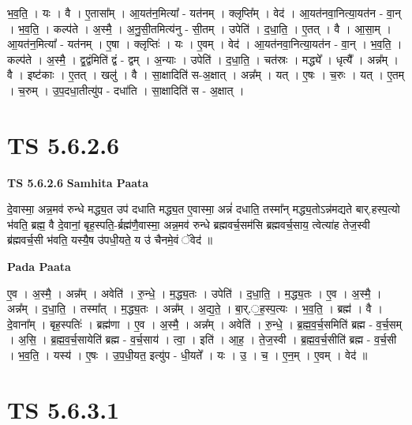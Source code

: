 \documentclass[17pt]{extarticle}
\begin{document}
भ॒व॒ति॒ । यः । वै । ए॒तासा᳚म् । आ॒यत॑न॒मित्या᳚ - यत॑नम् । क्लृप्ति᳚म् । वेद॑ । आ॒यत॑नवा॒नित्या॒यत॑न - वा॒न् । भ॒व॒ति॒ । कल्प॑ते । अ॒स्मै॒ । अ॒नु॒सी॒तमित्य॑नु - सी॒तम् । उपेति॑ । द॒धा॒ति॒ । ए॒तत् । वै । आ॒सा॒म् । आ॒यत॑न॒मित्या᳚ - यत॑नम् । ए॒षा । क्लृप्तिः॑ । यः । ए॒वम् । वेद॑ । आ॒यत॑नवा॒नित्या॒यत॑न - वा॒न् । भ॒व॒ति॒ । कल्प॑ते । अ॒स्मै॒ । द्व॒द्वंमिति॑ द्वं - द्वम् । अ॒न्याः । उपेति॑ । द॒धा॒ति॒ । चत॑स्रः । मद्ध्ये᳚ । धृत्यै᳚ । अन्न᳚म् । वै । इष्ट॑काः । ए॒तत् । खलु॑ । वै । सा॒क्षादिति॑ स-अ॒क्षात् । अन्न᳚म् । यत् । ए॒षः । च॒रुः । यत् । ए॒तम् । च॒रुम् । उ॒प॒दधा॒तीत्यु॑प - दधा॑ति । सा॒क्षादिति॑ स - अ॒क्षात् ।  \newline




\section*{ TS 5.6.2.6 }

\textbf{TS 5.6.2.6 } \newline
\textbf{Samhita Paata} \newline

दे॒वास्मा॒ अन्न॒मव॑ रुन्धे मद्ध्य॒त उप॑ दधाति मद्ध्य॒त ए॒वास्मा॒ अन्नं॑ दधाति॒ तस्मा᳚न् मद्ध्य॒तोऽन्न॑मद्यते बार्.हस्प॒त्यो भ॑वति॒ ब्रह्म॒ वै दे॒वानां॒ बृह॒स्पति॒-र्ब्रह्म॑णै॒वास्मा॒ अन्न॒मव॑ रुन्धे ब्रह्मवर्च॒सम॑सि ब्रह्मवर्च॒साय॒ त्वेत्या॑ह तेज॒स्वी ब्र॑ह्मवर्च॒सी भ॑वति॒ यस्यै॒ष उ॑पधी॒यते॒ य उ॑ चैनमे॒वं ॅवेद॑ ॥ \newline

\textbf{Pada Paata} \newline

ए॒व । अ॒स्मै॒ । अन्न᳚म् । अवेति॑ । रु॒न्धे॒ । म॒द्ध्य॒तः । उपेति॑ । द॒धा॒ति॒ । म॒द्ध्य॒तः । ए॒व । अ॒स्मै॒ । अन्न᳚म् । द॒धा॒ति॒ । तस्मा᳚त् । म॒द्ध्य॒तः । अन्न᳚म् । अ॒द्य॒ते॒ । बा॒र्.॒ह॒स्प॒त्यः । भ॒व॒ति॒ । ब्रह्म॑ । वै । दे॒वाना᳚म् । बृह॒स्पतिः॑ । ब्रह्म॑णा । ए॒व । अ॒स्मै॒ । अन्न᳚म् । अवेति॑ ।       रु॒न्धे॒ । ब्र॒ह्म॒व॒र्च॒समिति॑ ब्रह्म - व॒र्च॒सम् । अ॒सि॒ । ब्र॒ह्म॒व॒र्च॒सायेति॑ ब्रह्म - व॒र्च॒साय॑ । त्वा॒ । इति॑ । आ॒ह॒ । ते॒ज॒स्वी । ब्र॒ह्म॒व॒र्च॒सीति॑ ब्रह्म - व॒र्च॒सी । भ॒व॒ति॒ । यस्य॑ । ए॒षः । उ॒प॒धी॒यत॒ इत्यु॑प - धी॒यते᳚ । यः । उ॒ । च॒ । ए॒न॒म् । ए॒वम् । वेद॑ ॥  \newline




\section*{ TS 5.6.3.1 }
\end{document}
